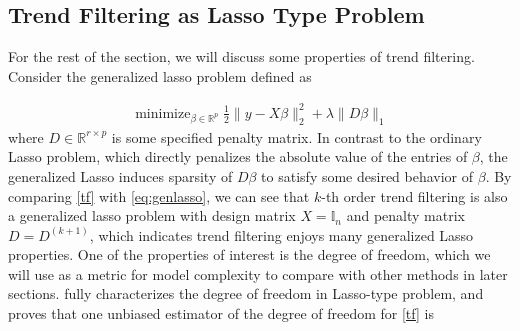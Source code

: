\documentclass[a4paper]{article}
\newcommand{\RR}{\mathbb{R}}
\DeclareMathOperator*{\minimize}{minimize}
\begin{document}
\subsection{Trend Filtering as Lasso Type Problem}
\label{subsec:tfaslasso}
For the rest of the section, we will discuss some properties of trend filtering. Consider the generalized lasso problem defined as

\begin{align}
\minimize_{\beta\in\RR^p} \frac{1}{2}\|y-X\beta\|_2^2 + \lambda\|D\beta\|_1 \label{eq:genlasso}
\end{align}
where $D\in\RR^{r\times p}$ is some specified penalty matrix. In contrast to the ordinary Lasso problem, which directly penalizes the absolute value of the entries of $\beta$, the generalized Lasso induces sparsity of $D\beta$ to satisfy some desired behavior of $\beta$. By comparing \eqref{tf} with \eqref{eq:genlasso}, we can see that $k$-th order trend filtering is also a generalized lasso problem with design matrix $X = \mathbb{I}_n$ and penalty matrix $D = D^{(k+1)}$, which indicates trend filtering enjoys many generalized Lasso properties. One of the properties of interest is the degree of freedom, which we will use as a metric for model complexity to compare with other methods in later sections. \cite{tibshirani2011solution} fully characterizes the degree of freedom in Lasso-type problem, and proves that one unbiased estimator of the degree of freedom for \eqref{tf} is
\end{document}
